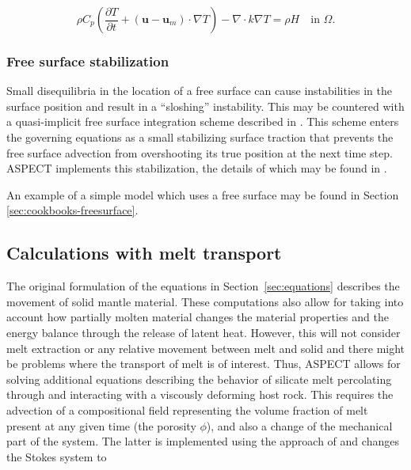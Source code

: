 \documentclass{article}
\newcommand{\aspect}{\textsc{ASPECT}}
\begin{document}
\begin{equation*}
  \rho C_p \left(\frac{\partial T}{\partial t} + \left(\mathbf u - \mathbf u_m \right) \cdot\nabla T\right)
  - \nabla\cdot k\nabla T
  =
  \rho H
   \quad
   \textrm{in $\Omega$}.
\end{equation*}

\subsubsection{Free surface stabilization}

Small disequilibria in the location of a free surface can cause instabilities in
the surface position and result in a ``sloshing'' instability.  This may be countered with a
quasi-implicit free surface integration scheme described in \cite{KMM2010}.
This scheme enters the governing equations as a small stabilizing surface
traction that prevents the free surface advection from overshooting its
true position at the next time step.  \aspect{} implements this stabilization,
the details of which may be found in \cite{KMM2010}.

An example of a simple model which uses a free surface may be found in Section \ref{sec:cookbooks-freesurface}.

\subsection{Calculations with melt transport}
\label{sec:melt_transport}

The original formulation of the equations in Section~\ref{sec:equations} describes the movement of solid mantle material. These computations also allow for taking into account how partially molten material changes the material properties and the energy balance through the release of latent heat. However, this will not consider melt extraction or any relative movement between melt and solid and there might be problems where the transport of melt is of interest. Thus, \aspect{} allows for solving additional equations describing the behavior of silicate melt percolating through and interacting with a viscously deforming host rock. This requires
the advection of a compositional field representing the volume fraction of melt present at any given time (the porosity $\phi$),
and also a change of the mechanical part of the system. The latter is implemented using the approach of \cite{KMK2013} and changes
the Stokes system to
\end{document}
